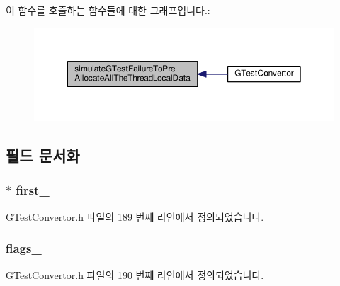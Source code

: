 이 함수를 호출하는 함수들에 대한 그래프입니다.\+:
\nopagebreak
\begin{figure}[H]
\begin{center}
\leavevmode
\includegraphics[width=350pt]{class_g_test_convertor_a8718e883d32eef7058c8e67fb5bddafd_icgraph}
\end{center}
\end{figure}




\subsection{필드 문서화}
\subsubsection[{\texorpdfstring{first\+\_\+}{first_}}]{$\ast$ first\+\_\+\hspace{0.3cm}{\ttfamily [private]}}\hypertarget{class_g_test_convertor_a930ddc4a91132d6951461654933cd74c}{}\label{class_g_test_convertor_a930ddc4a91132d6951461654933cd74c}


G\+Test\+Convertor.\+h 파일의 189 번째 라인에서 정의되었습니다.

\subsubsection[{\texorpdfstring{flags\+\_\+}{flags_}}]{ flags\+\_\+\hspace{0.3cm}{\ttfamily [private]}}\hypertarget{class_g_test_convertor_a74ef936e2cd31159a036cf386411c9f1}{}\label{class_g_test_convertor_a74ef936e2cd31159a036cf386411c9f1}


G\+Test\+Convertor.\+h 파일의 190 번째 라인에서 정의되었습니다.

